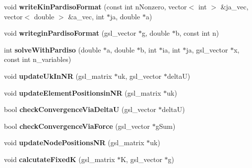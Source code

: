 \begin{DoxyCompactItemize}
\item 
\hypertarget{classSimulation_a0f0e358f99d5f4a286a464342ab11104}{}void {\bfseries write\+Kin\+Pardiso\+Format} (const int n\+Nonzero, vector$<$ int $>$ \&ja\+\_\+vec, vector$<$ double $>$ \&a\+\_\+vec, int $\ast$ja, double $\ast$a)\label{classSimulation_a0f0e358f99d5f4a286a464342ab11104}

\item 
\hypertarget{classSimulation_ad834b670e7fc5a7933d441d2278d622d}{}void {\bfseries writegin\+Pardiso\+Format} (gsl\+\_\+vector $\ast$g, double $\ast$b, const int n)\label{classSimulation_ad834b670e7fc5a7933d441d2278d622d}

\item 
\hypertarget{classSimulation_acb243ba7dd91cba4e63533ae9b5edd8a}{}int {\bfseries solve\+With\+Pardiso} (double $\ast$a, double $\ast$b, int $\ast$ia, int $\ast$ja, gsl\+\_\+vector $\ast$x, const int n\+\_\+variables)\label{classSimulation_acb243ba7dd91cba4e63533ae9b5edd8a}

\item 
\hypertarget{classSimulation_a938793b4f60eebdd88f7a3a9791819a0}{}void {\bfseries update\+Uk\+In\+N\+R} (gsl\+\_\+matrix $\ast$uk, gsl\+\_\+vector $\ast$delta\+U)\label{classSimulation_a938793b4f60eebdd88f7a3a9791819a0}

\item 
\hypertarget{classSimulation_aed6fc494b468ebd56c07625d3e5984ff}{}void {\bfseries update\+Element\+Positionsin\+N\+R} (gsl\+\_\+matrix $\ast$uk)\label{classSimulation_aed6fc494b468ebd56c07625d3e5984ff}

\item 
\hypertarget{classSimulation_a0bda2f370a66828c5ca3420ddeeb2d4d}{}bool {\bfseries check\+Convergence\+Via\+Delta\+U} (gsl\+\_\+vector $\ast$delta\+U)\label{classSimulation_a0bda2f370a66828c5ca3420ddeeb2d4d}

\item 
\hypertarget{classSimulation_a8a2b44a93f87f9e0de158c4f422ff13c}{}bool {\bfseries check\+Convergence\+Via\+Force} (gsl\+\_\+vector $\ast$g\+Sum)\label{classSimulation_a8a2b44a93f87f9e0de158c4f422ff13c}

\item 
\hypertarget{classSimulation_aea943e8e0caf1b9ff8e40b61248024b6}{}void {\bfseries update\+Node\+Positions\+N\+R} (gsl\+\_\+matrix $\ast$uk)\label{classSimulation_aea943e8e0caf1b9ff8e40b61248024b6}

\item 
\hypertarget{classSimulation_a0964cdce312e239d588d0dd9cade5190}{}void {\bfseries calcutate\+Fixed\+K} (gsl\+\_\+matrix $\ast$K, gsl\+\_\+vector $\ast$g)\label{classSimulation_a0964cdce312e239d588d0dd9cade5190}


\end{DoxyCompactItemize}
